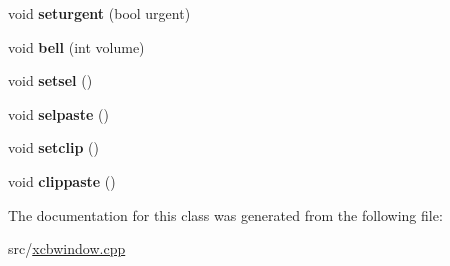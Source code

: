 \begin{DoxyCompactItemize}
\item 
\mbox{\label{classxcbwin_1_1XcbWindow_acae1db096469ff95ec0696d0509738ee}} 
void {\bfseries seturgent} (bool urgent)
\item 
\mbox{\label{classxcbwin_1_1XcbWindow_af66cdaf3928ee4c3c9bfd48a1ac10cc3}} 
void {\bfseries bell} (int volume)
\item 
\mbox{\label{classxcbwin_1_1XcbWindow_aee6a2e32aaa392628efafe667c3f2505}} 
void {\bfseries setsel} ()
\item 
\mbox{\label{classxcbwin_1_1XcbWindow_a296f6f402acec7acffd797fffbee90fb}} 
void {\bfseries selpaste} ()
\item 
\mbox{\label{classxcbwin_1_1XcbWindow_acac3ff7e5c2e25e8f3f71ce5576de8cf}} 
void {\bfseries setclip} ()
\item 
\mbox{\label{classxcbwin_1_1XcbWindow_ad63eda303efc057380177dfb81467332}} 
void {\bfseries clippaste} ()
\end{DoxyCompactItemize}


The documentation for this class was generated from the following file\+:\begin{DoxyCompactItemize}
\item 
src/\mbox{\hyperlink{xcbwindow_8cpp}{xcbwindow.\+cpp}}\end{DoxyCompactItemize}
